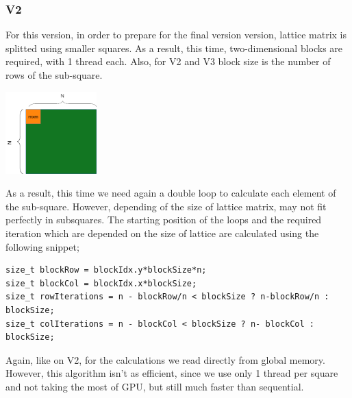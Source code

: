 \documentclass[11pt]{article}
\begin{document}
\subsubsection{V2}
\label{sec:org55afa9a}
For this version, in order to prepare for the final version version, lattice matrix is splitted using smaller squares. As a result, this time, two-dimensional blocks are required, with 1 thread each. Also, for V2 and V3 block size is the number of rows of the sub-square.
\begin{center}
\includegraphics[height=120]{./images/cuda-square-split.png}
\end{center}
As a result, this time we need again a double loop to calculate each element of the sub-square. However, depending of the size of lattice matrix, may not fit perfectly in subsquares. The starting position of the loops and the required iteration which are depended on the size of lattice are calculated using the following snippet;
\begin{verbatim}
size_t blockRow = blockIdx.y*blockSize*n;
size_t blockCol = blockIdx.x*blockSize;
size_t rowIterations = n - blockRow/n < blockSize ? n-blockRow/n : blockSize;
size_t colIterations = n - blockCol < blockSize ? n- blockCol : blockSize;
\end{verbatim}
Again, like on V2, for the calculations we read directly from global memory. However, this algorithm isn't as efficient, since we use only 1 thread per square and not taking the most of GPU, but still much faster than sequential.
\end{document}
